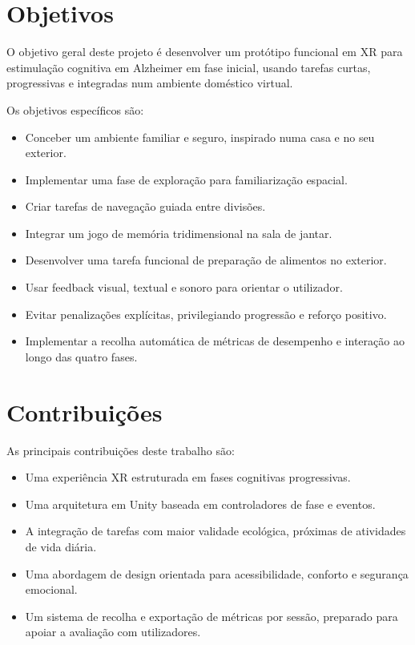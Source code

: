 \documentclass[12pt,a4paper,oneside]{report}
\begin{document}
\section{Objetivos}

O objetivo geral deste projeto é desenvolver um protótipo funcional em \ac{XR} para estimulação cognitiva em Alzheimer em fase inicial, usando tarefas curtas, progressivas e integradas num ambiente doméstico virtual.

Os objetivos específicos são:

\begin{itemize}
    \item Conceber um ambiente familiar e seguro, inspirado numa casa e no seu exterior.
    \item Implementar uma fase de exploração para familiarização espacial.
    \item Criar tarefas de navegação guiada entre divisões.
    \item Integrar um jogo de memória tridimensional na sala de jantar.
    \item Desenvolver uma tarefa funcional de preparação de alimentos no exterior.
    \item Usar feedback visual, textual e sonoro para orientar o utilizador.
    \item Evitar penalizações explícitas, privilegiando progressão e reforço positivo.
    \item Implementar a recolha automática de métricas de desempenho e interação ao longo das quatro fases.
\end{itemize}

\section{Contribuições}

As principais contribuições deste trabalho são:

\begin{itemize}
    \item Uma experiência \ac{XR} estruturada em fases cognitivas progressivas.
    \item Uma arquitetura em Unity baseada em controladores de fase e eventos.
    \item A integração de tarefas com maior validade ecológica, próximas de atividades de vida diária.
    \item Uma abordagem de design orientada para acessibilidade, conforto e segurança emocional.
    \item Um sistema de recolha e exportação de métricas por sessão, preparado para apoiar a avaliação com utilizadores.
\end{itemize}
\end{document}
